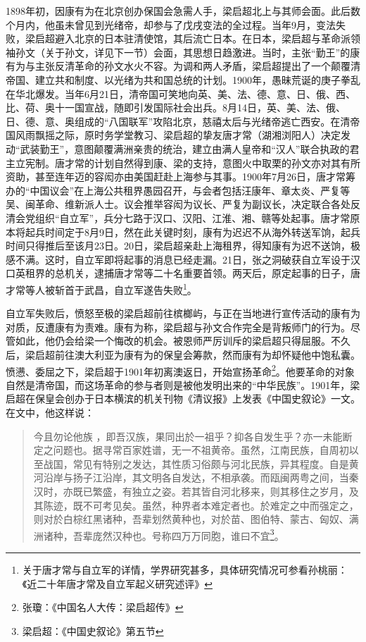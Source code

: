 1898年初，因康有为在北京创办保国会急需人手，梁启超北上与其师会面。此后数个月内，他虽未曾见到光绪帝，却参与了戊戌变法的全过程。当年9月，变法失败，梁启超避入北京的日本驻清使馆，其后流亡日本。在日本，梁启超与革命派领袖孙文（关于孙文，详见下一节）会面，其思想日趋激进。当时，主张“勤王”的康有为与主张反清革命的孙文水火不容。为调和两人矛盾，梁启超提出了一个颠覆清帝国、建立共和制度、以光绪为共和国总统的计划。1900年，愚昧荒诞的庚子拳乱在华北爆发。当年6月21日，清帝国可笑地向英、美、法、德、意、日、俄、西、比、荷、奥十一国宣战，随即引发国际社会出兵。8月14日，英、美、法、俄、日、德、意、奥组成的“八国联军”攻陷北京，慈禧太后与光绪帝逃亡西安。在清帝国风雨飘摇之际，原时务学堂教习、梁启超的挚友唐才常（湖湘浏阳人）决定发动“武装勤王”，意图颠覆满洲亲贵的统治，建立由满人皇帝和“汉人”联合执政的君主立宪制。唐才常的计划自然得到康、梁的支持，意图火中取栗的孙文亦对其有所资助，甚至连年迈的容闳亦由美国赶赴上海参与其事。1900年7月26日，唐才常筹办的“中国议会”在上海公共租界愚园召开，与会者包括汪康年、章太炎、严复等吴、闽革命、维新派人士。议会推举容闳为议长、严复为副议长，决定联合各处反清会党组织“自立军”，兵分七路于汉口、汉阳、江淮、湘、赣等处起事。唐才常原本将起兵时间定于8月9日，然在此关键时刻，康有为迟迟不从海外转送军饷，起兵时间只得推后至该月23日。20日，梁启超亲赴上海租界，得知康有为迟不送饷，极感不满。这时，自立军即将起事的消息已经走漏。21日，张之洞破获自立军设于汉口英租界的总机关，逮捕唐才常等二十名重要首领。两天后，原定起事的日子，唐才常等人被斩首于武昌，自立军遂告失败\footnote{关于唐才常与自立军的详情，学界研究甚多，具体研究情况可参看孙桃丽：《近二十年唐才常及自立军起义研究述评》}。

自立军失败后，愤怒至极的梁启超前往槟榔屿，与正在当地进行宣传活动的康有为对质，反遭康有为责难。康有为称，梁启超与孙文合作完全是背叛师门的行为。尽管如此，他仍会给梁一个悔改的机会。被恩师严厉训斥的梁启超只得屈服。不久后，梁启超前往澳大利亚为康有为的保皇会筹款，然而康有为却怀疑他中饱私囊。愤懑、委屈之下，梁启超于1901年初离澳返日，开始宣扬革命\footnote{张瓊：《中国名人大传：梁启超传》}。他要革命的对象自然是清帝国，而这场革命的参与者则是被他发明出来的“中华民族”。1901年，梁启超在保皇会创办于日本横滨的机关刊物《清议报》上发表《中国史叙论》一文。在文中，他这样说：

\begin{quote}

今且勿论他族 ，即吾汉族，果同出於一祖乎？抑各自发生乎？亦一未能断定之问题也。据寻常百家姓谱，无一不祖黄帝。虽然，江南民族，自周初以至战国，常见有特别之发达，其性质习俗颇与河北民族，异其程度。自是黄河沿岸与扬子江沿岸，其文明各自发达，不相承袭。而瓯闽两粤之间，当秦汉时，亦既已繁盛，有独立之姿。若其皆自河北移来，则其移住之岁月，及其陈迹，既不可考见矣。虽然，种界者本难定者也。於难定之中而强定之，则对於白棕红黑诸种，吾辈划然黄种也，对於苗、图伯特、蒙古、匈奴、满洲诸种，吾辈庞然汉种也。号称四万万同胞，谁曰不宜\footnote{梁启超：《中国史叙论》第五节}。

\end{quote}

